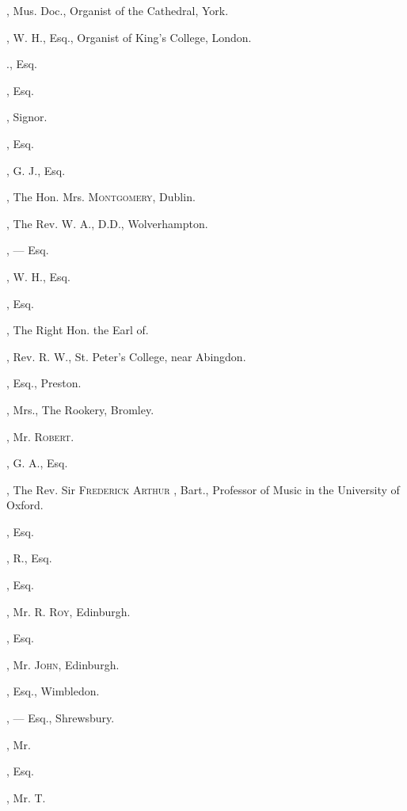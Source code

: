 \begin{multicols}{2}
, Mus. Doc., Organist
of the Cathedral, York.

, W. H., Esq., Organist of King’s
College, London.

., Esq.

, Esq.

, Signor.

, Esq.

, G. J., Esq.

, The Hon. Mrs. \textsc{Montgomery},
Dublin.
\columnbreak

, The Rev. W. A., D.D., Wolverhampton.

, — Esq.

, W. H., Esq.

, Esq.

, The Right Hon. the Earl of.

, Rev. R. W., St. Peter’s College,
near Abingdon.

, Esq., Preston.

, Mrs., The Rookery, Bromley.
\bigskip

, Mr. \textsc{Robert}.

, G. A., Esq.

, The Rev. Sir \textsc{Frederick Arthur}
, Bart., Professor of Music in the
University of Oxford.

, Esq.
\bigskip

, R., Esq.

, Esq.

, Mr. R. \textsc{Roy}, Edinburgh.

, Esq.

, Mr. \textsc{John}, Edinburgh.

, Esq., Wimbledon.
\bigskip

, — Esq., Shrewsbury.

, Mr.

, Esq.

, Mr. T.


\end{multicols}
